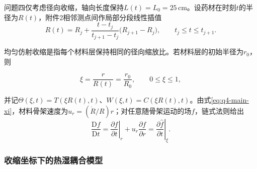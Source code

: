 \documentclass[withoutpreface,bwprint]{cumcmthesis}
\begin{document}
问题四仅考虑径向收缩，轴向长度保持$L(t)=L_0=25\,\mathrm{cm}$。设药材在时刻$t$的半径为$R(t)$，附件2相邻测点间作局部分段线性插值
\begin{equation}
R(t)=R_j+\frac{t-t_j}{t_{j+1}-t_j}\bigl(R_{j+1}-R_j\bigr),
\qquad t_j\le t\le t_{j+1}.
\label{eq:q4-main-radius}
\end{equation}

均匀仿射收缩是指每个材料层保持相同的径向缩放比。若材料层的初始半径为$r_0$，则

\begin{equation}
\xi=\frac{r}{R(t)}=\frac{r_0}{R_0},
\qquad 0\le\xi\le1,
\label{eq:q4-main-xi}
\end{equation}

并记$\Theta(\xi,t)=T(\xi R(t),t)$、$W(\xi,t)=C(\xi R(t),t)$。由式\eqref{eq:q4-main-xi}，材料骨架速度为$u_r=(\dot R/R)r$；对任意随骨架运动的场$f$，链式法则给出
\begin{equation}
\frac{\mathrm Df}{\mathrm Dt}
=\left.\frac{\partial f}{\partial t}\right|_r
+u_r\frac{\partial f}{\partial r}
=\left.\frac{\partial \widehat f}{\partial t}\right|_\xi.
\label{eq:q4-main-material-derivative}
\end{equation}

\subsubsection{收缩坐标下的热湿耦合模型}
\end{document}
